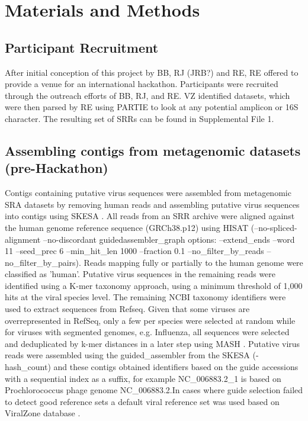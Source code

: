 \section{Materials and Methods}

  \subsection{Participant Recruitment}
  After initial conception of this project by BB, RJ (JRB?) and RE, RE offered
  to provide a venue for an international hackathon.  Participants were
  recruited through the outreach efforts of BB, RJ, and RE.  VZ identified
  datasets, which were then parsed by RE using PARTIE \cite{Torres2017} to look at any potential
  amplicon or 16S character.  The resulting set of SRRs can be found in
  Supplemental File 1.


  \subsection{Assembling contigs from metagenomic datasets (pre-Hackathon)}
  Contigs containing putative virus sequences were assembled from metagenomic
  SRA datasets by removing human reads and assembling putative virus sequences
  into contigs using SKESA \cite{Souvorov2018}. All reads from an SRR archive
  were aligned against the human genome reference sequence (GRCh38.p12) using
  HISAT \cite{Kim2015} (--no-spliced-alignment --no-discordant
  guidedassembler\_graph options: --extend\_ends  --word 11 --seed\_prec 6
  --min\_hit\_len 1000 --fraction 0.1 --no\_filter\_by\_reads
  --no\_filter\_by\_pairs). Reads mapping fully or partially  to the human
  genome were  classified as 'human'. Putative virus sequences in the remaining
  reads were identified using a K-mer taxonomy approach, using a minimum
  threshold of 1,000 hits at the viral species level. The remaining NCBI
  taxonomy identifiers were used to extract sequences from Refseq. Given that
  some viruses are overrepresented in RefSeq,  only a few per species were
  selected at random while for viruses with segmented genomes, e.g. Influenza,
  all sequences were selected and deduplicated by k-mer distances in a later
  step using MASH \cite{Ondov2019}. Putative virus reads were assembled using
  the guided\_assembler from the SKESA (-hash\_count) and these contigs
  obtained identifiers based on the guide accessions with a sequential index as
  a suffix, for example NC\_006883.2\_1 is based on Prochlorococcus phage
  genome NC\_006883.2.In cases where guide selection failed to detect good
  reference sets a default viral reference set was used based on ViralZone
  database \cite{Hulo2011}.

